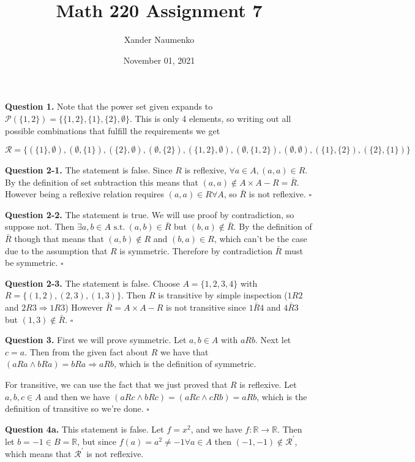 \documentclass[letterpaper, reqno,11pt]{article}
\newcommand{\RR}{\mathbb{R}}
\newcommand{\st}{\text{ s.t.}\ }
\begin{document}
\title{Math 220 Assignment 7}
\date{November 01, 2021}
\author{Xander Naumenko}
\maketitle

 {\noindent\bf Question 1.} Note that the power set given expands to $\mathcal{P}(\{1, 2\})=\{\{1, 2\}, \{1\}, \{2\}, \emptyset\}$. This is only 4 elements, so writing out all possible combinations that fulfill the requirements we get 

 $$
    \mathcal{R}=\{(\{1\}, \emptyset),(\emptyset, \{1\}), (\{2\}, \emptyset),(\emptyset, \{2\}), (\{1, 2\}, \emptyset), ( \emptyset, \{1, 2\}), (\emptyset, \emptyset), (\{1\}, \{2\}), (\{2\}, \{1\})\}
 $$

{\noindent\bf Question 2-1.} The statement is false. Since $R$ is reflexive, $\forall a\in A, (a, a)\in R$. By the definition of set subtraction this means that $(a, a)\notin A\times A-R=\bar R$. However being a reflexive relation requires $(a, a)\in R\forall A$, so $\bar R$ is not reflexive. $\square$

{\noindent\bf Question 2-2.} The statement is true. We will use proof by contradiction, so suppose not. Then $\exists a, b\in A\st (a, b)\in\bar R$ but $(b, a)\notin\bar R$. By the definition of $\bar R$ though that means that $(a, b)\notin R$ and $(b, a)\in R$, which can't be the case due to the assumption that $R$ is symmetric. Therefore by contradiction $\bar R$ must be symmetric. $\square$

{\noindent\bf Question 2-3.} The statement is false. Choose $A=\{1, 2, 3, 4\}$ with $R=\{(1, 2), (2, 3), (1, 3)\}$. Then $R$ is transitive by simple inspection ($1R2$ and $2R3\Rightarrow 1R3$) However $\bar R=A\times A-R$ is not transitive since $1\bar R4$ and $4\bar R 3$ but $(1, 3)\notin\bar R$. $\square$

{\noindent\bf Question 3.} First we will prove symmetric. Let $a, b\in A$ with $a Rb$. Next let $c=a$. Then from the given fact about $R$ we have that $(aRa\wedge bRa)=bRa\Rightarrow aRb$, which is the definition of symmetric. 

For transitive, we can use the fact that we just proved that $R$ is reflexive. Let $a, b, c\in A$ and then we have $(aRc\wedge bRc)=(aRc\wedge cRb)=aR b$, which is the definition of transitive so we're done. $\square$
 
{\noindent\bf Question 4a.} This statement is false. Let $f=x^2$, and we have $f:\RR\to\RR$. Then let $b=-1\in B=\RR$, but since $f(a)=a^2\neq -1\forall a\in A$ then $(-1, -1)\notin \mathcal{R}^\prime$, which means that $\mathcal{R}^\prime$ is not reflexive. 
\end{document}
